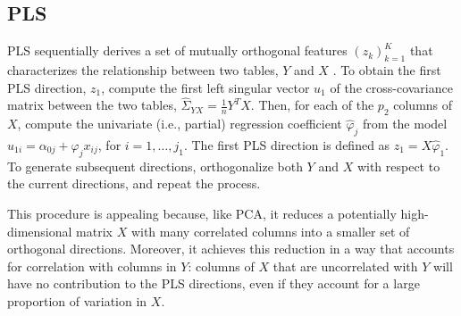 \documentclass{article}
\begin{document}


\subsection{PLS}
\label{subsec:PLS}

PLS sequentially derives a set of mutually orthogonal features
$\left(z_{k}\right)_{k = 1}^{K}$ that characterizes the relationship between two
tables, $Y$ and $X$ \citep{wold1985partial}. To obtain the first PLS direction,
$z_{1}$, compute the first left singular vector $u_{1}$ of the cross-covariance
matrix between the two tables, $\hat{\Sigma}_{YX} = \frac{1}{n}Y^{T}X$. Then,
for each of the $p_{2}$ columns of $X$, compute the univariate (i.e., partial)
regression coefficient $\hat{\varphi}_{j}$ from the model $u_{1i} = \alpha_{0j}
+ \varphi_{j}x_{ij}$, for $i = 1, \dots, j_{1}$. The first PLS direction is
defined as $z_{1} = X\hat{\varphi}_{1}$. To generate subsequent directions,
orthogonalize both $Y$ and $X$ with respect to the current directions, and
repeat the process.

This procedure is appealing because, like PCA, it reduces a potentially
high-dimensional matrix $X$ with many correlated columns into a
smaller set of orthogonal directions. Moreover, it achieves this
reduction in a way that accounts for correlation with columns in
$Y$: columns of $X$ that are uncorrelated with $Y$
will have no contribution to the PLS directions, even if they account
for a large proportion of variation in $X$.
\end{document}
